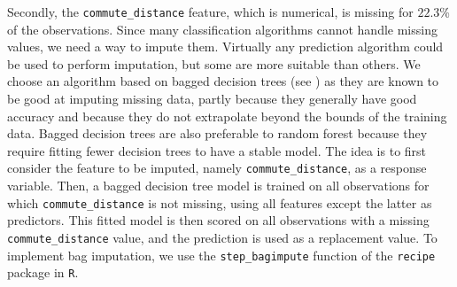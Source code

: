 \documentclass{article}
\begin{document}
Secondly, the \texttt{commute\_distance} feature, which is numerical, is missing for $22.3$\% of the observations. Since many classification algorithms cannot handle missing values, we need a way to impute them. Virtually any prediction algorithm could be used to perform imputation, but some are more suitable than others. We choose an algorithm based on bagged decision trees (see \cite{breiman1996bagging}) as they are known to be good at imputing missing data, partly because they generally have good accuracy and because they do not extrapolate beyond the bounds of the training data. Bagged decision trees are also preferable to random forest because they require fitting fewer decision trees to have a stable model. The idea is to first consider the feature to be imputed, namely \texttt{commute\_distance}, as a response variable. Then, a bagged decision tree model is trained on all observations for which \texttt{commute\_distance} is not missing, using all features except the latter as predictors. This fitted model is then scored on all observations with a missing \texttt{commute\_distance} value, and the prediction is used as a replacement value. To implement bag imputation, we use the \texttt{step\_bagimpute} function of the \texttt{recipe} package in \texttt{R}. 
\end{document}
